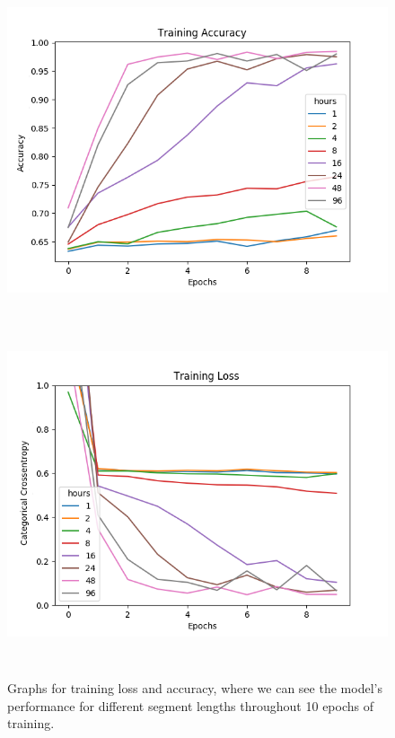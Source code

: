 \begin{figure}
\begin{center}
      \includegraphics[height=10cm]{img/control_condition/plot_acc_train.png}
      \includegraphics[height=10cm]{img/control_condition/plot_loss_train.png}

      \caption{Graphs for training loss and accuracy, where we can see the model's performance for different segment lengths throughout 10 epochs of training.}
      \label{figure:control_condition_10e_train}
\end{center}
\end{figure}

